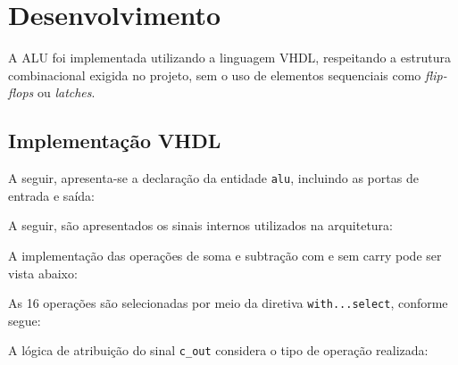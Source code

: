 \section{Desenvolvimento}

A ALU foi implementada utilizando a linguagem VHDL, respeitando a estrutura combinacional exigida no projeto, sem o uso de elementos sequenciais como \textit{flip-flops} ou \textit{latches}.

\subsection{Implementação VHDL}

A seguir, apresenta-se a declaração da entidade \texttt{alu}, incluindo as portas de entrada e saída:

\begin{figure}[H]
\centering

\end{figure}

A seguir, são apresentados os sinais internos utilizados na arquitetura:

\begin{figure}[H]
\centering

\end{figure}

A implementação das operações de soma e subtração com e sem carry pode ser vista abaixo:

\begin{figure}[H]
\centering

\end{figure}

As 16 operações são selecionadas por meio da diretiva \texttt{with...select}, conforme segue:

\begin{figure}[H]
\centering

\end{figure}    

A lógica de atribuição do sinal \texttt{c\_out} considera o tipo de operação realizada:

\begin{figure}[H]
\centering

\end{figure}

